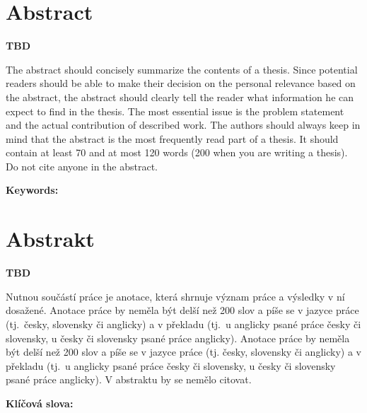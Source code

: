 \section*{Abstract}

\textbf{TBD}

The abstract should concisely summarize the
contents of a thesis. Since potential readers should be able to
make their decision on the personal relevance based on the abstract,
the abstract should clearly tell the reader what information
he can expect to find in the thesis. The most essential issue
is the problem statement and the actual contribution of described
work. The authors should always keep in mind that the
abstract is the most frequently read part of a thesis. It should
contain at least 70 and at most 120 words (200 when you are writing a thesis).
Do not cite anyone in the abstract.

\bigskip

\textbf{Keywords:} \Keywords


\bigskip

\section*{Abstrakt}\label{abstract}

\textbf{TBD}

Nutnou sou\v{c}\'{a}st\'{i} pr\'{a}ce je anotace, kter\'{a} shrnuje v\'{y}znam pr\'{a}ce a v\'{y}sledky v n\'{i} dosa\v{z}en\'{e}.
Anotace pr\'{a}ce by nem\v{e}la b\'{y}t del\v{s}\'{i} ne\v{z} 200 slov a p\'{i}\v{s}e se v jazyce pr\'{a}ce (tj.\ \v{c}esky, slovensky \v{c}i anglicky) a v p\v{r}ekladu (tj.\ u anglicky psan\'{e} pr\'{a}ce \v{c}esky \v{c}i slovensky, u \v{c}esky \v{c}i slovensky psan\'{e} pr\'{a}ce anglicky).
Anotace pr\'{a}ce by nem\v{e}la b\'{y}t del\v{s}\'{i} ne\v{z} 200 slov a p\'{i}\v{s}e se v jazyce pr\'{a}ce (tj. \v{c}esky, slovensky \v{c}i anglicky) a v p\v{r}ekladu (tj.\ u anglicky psan\'{e} pr\'{a}ce \v{c}esky \v{c}i slovensky, u \v{c}esky \v{c}i slovensky psan\'{e} pr\'{a}ce anglicky). V abstraktu by se nem\v{e}lo citovat.

\bigskip

\textbf{Kl\'{i}\v{c}ov\'{a} slova:} \Klic

